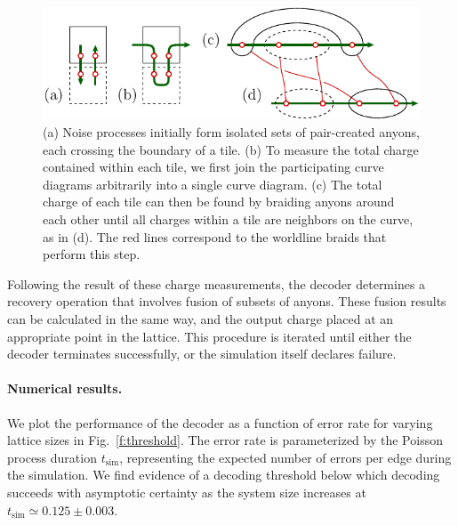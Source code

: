 \documentclass[aps, prl, letterpaper, twocolumn, superscriptaddress, notitlepage, 10pt]{revtex4}
\newcommand{\Fref}[1]{Fig.~\ref{#1}}
\begin{document}
\begin{figure}[t!]
\begin{center}
	\includegraphics[width=1.0\columnwidth]{pic-syndrome.pdf}
\caption{
(a) Noise processes initially form isolated sets of pair-created anyons, 
each crossing the boundary of a tile. 
(b) To measure the total charge 
contained within each tile, 
we first join the participating curve 
diagrams arbitrarily into a single curve diagram.
(c) The total charge of each tile can then be found 
by braiding anyons around each other until all charges within 
a tile are neighbors on the curve, as in (d).  
The red lines correspond to the worldline braids that perform this step.
}
\label{f:syndrome}
\end{center}
\vspace{-10pt}
\end{figure}

Following the result of these charge measurements, the decoder determines 
a recovery operation that involves fusion of subsets of anyons. 
These fusion results can be calculated in the same way, 
and the output charge placed at an appropriate point in the lattice. 
This procedure is iterated until either the decoder terminates successfully, 
or the simulation itself declares failure.


\paragraph{Numerical results.}

We plot the performance of the decoder as a function of error rate for varying lattice sizes in 
\Fref{f:threshold}. 
The error rate is parameterized by the Poisson process duration $t_{\mathrm{sim}}$, representing the expected number of errors per edge during the simulation. 
We find evidence of a decoding threshold below which decoding succeeds with asymptotic 
certainty as the system size increases at $t_{\mathrm{sim}}\simeq 0.125 \pm 0.003$.
\end{document}
